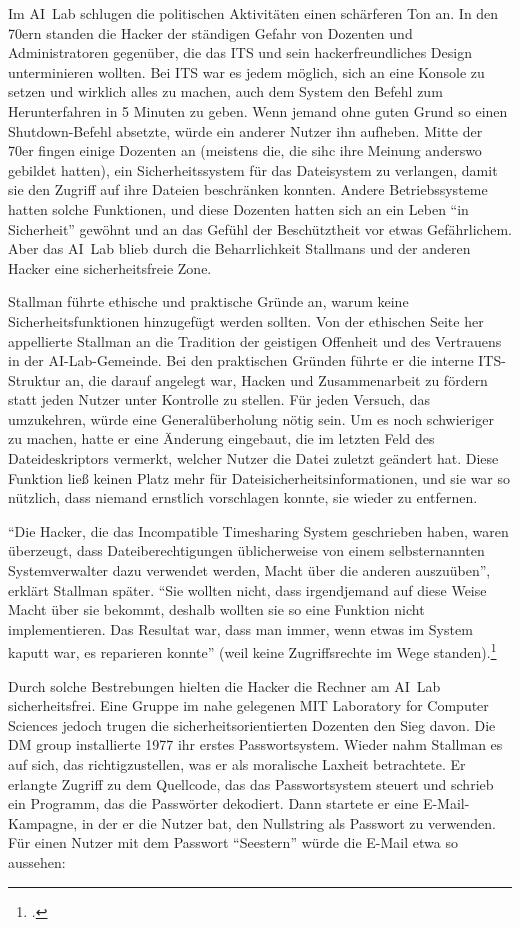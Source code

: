 Im AI~Lab schlugen die politischen Aktivitäten einen schärferen Ton an. In den 70ern standen die Hacker der ständigen Gefahr von Dozenten und Administratoren gegenüber, die das ITS und sein hackerfreundliches Design unterminieren wollten. Bei ITS war es jedem möglich, sich an eine Konsole zu setzen und wirklich alles zu machen, auch dem System den Befehl zum Herunterfahren in 5 Minuten zu geben. Wenn jemand ohne guten Grund so einen Shutdown-Befehl absetzte, würde ein anderer Nutzer ihn aufheben. Mitte der 70er fingen einige Dozenten an (meistens die, die sihc ihre Meinung anderswo gebildet hatten), ein Sicherheitssystem für das Dateisystem zu verlangen, damit sie den Zugriff auf ihre Dateien beschränken konnten. Andere Betriebssysteme hatten solche Funktionen, und diese Dozenten hatten sich an ein Leben "`in Sicherheit"' gewöhnt und an das Gefühl der Beschütztheit vor etwas Gefährlichem. Aber das AI~Lab blieb durch die Beharrlichkeit Stallmans und der anderen Hacker eine sicherheitsfreie Zone.

Stallman führte ethische und praktische Gründe an, warum keine Sicherheitsfunktionen hinzugefügt werden sollten. Von der ethischen Seite her appellierte Stallman an die Tradition der geistigen Offenheit und des Vertrauens in der AI-Lab-Gemeinde. Bei den praktischen Gründen führte er die interne ITS-Struktur an, die darauf angelegt war, Hacken und Zusammenarbeit zu fördern statt jeden Nutzer unter Kontrolle zu stellen. Für jeden Versuch, das umzukehren, würde eine Generalüberholung nötig sein. Um es noch schwieriger zu machen, hatte er eine Änderung eingebaut, die im letzten Feld des Dateideskriptors vermerkt, welcher Nutzer die Datei zuletzt geändert hat. Diese Funktion ließ keinen Platz mehr für Dateisicherheitsinformationen, und sie war so nützlich, dass niemand ernstlich vorschlagen konnte, sie wieder zu entfernen.

"`Die Hacker, die das Incompatible Timesharing System geschrieben haben, waren überzeugt, dass Dateiberechtigungen üblicherweise von einem selbsternannten Systemverwalter dazu verwendet werden, Macht über die anderen auszuüben"', erklärt Stallman später. "`Sie wollten nicht, dass irgendjemand auf diese Weise Macht über sie bekommt, deshalb wollten sie so eine Funktion nicht implementieren. Das Resultat war, dass man immer, wenn etwas im System kaputt war, es reparieren konnte"' (weil keine Zugriffsrechte im Wege standen).\footcite{rmskth}

Durch solche Bestrebungen hielten die Hacker die Rechner am AI~Lab sicherheitsfrei. Eine Gruppe im nahe gelegenen MIT Laboratory for Computer Sciences jedoch trugen die sicherheitsorientierten Dozenten den Sieg davon. Die DM group installierte 1977 ihr erstes Passwortsystem. Wieder nahm Stallman es auf sich, das richtigzustellen, was er als moralische Laxheit betrachtete. Er erlangte Zugriff zu dem Quellcode, das das Passwortsystem steuert und schrieb ein Programm, das die Passwörter dekodiert. Dann startete er eine E-Mail-Kampagne, in der er die Nutzer bat, den Nullstring als Passwort zu verwenden. Für einen Nutzer mit dem Passwort "`Seestern"' würde die E-Mail etwa so aussehen:

